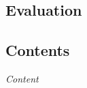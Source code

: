   \begin{titlepage}
    \vspace*{\fill}
      \part{Evaluation}
    \vspace*{\fill}
  \end{titlepage}

\startcontents[parts]
  
\chapter*{Contents}

\textit{Content}

\vspace{\baselineskip}


\pagebreak


\newpage

\newpage


\stopcontents[parts]